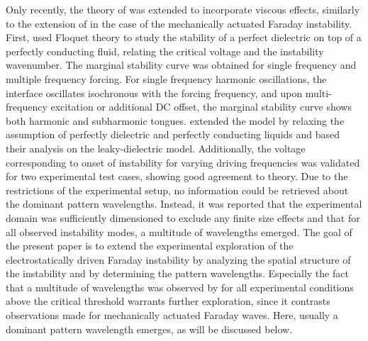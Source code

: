 \documentclass{jfm_arxiv}
\begin{document}
Only recently, the theory of \citet{Yih1968} was extended to incorporate viscous effects, similarly to the extension of \citet{Kumar1994} in the case of the mechanically actuated Faraday instability. First, \citet{Bandopadhyay2017} used Floquet theory to study the stability of a perfect dielectric on top of a perfectly conducting fluid, relating the critical voltage and the instability wavenumber.
The marginal stability curve was obtained for single frequency and multiple frequency forcing. For single frequency harmonic oscillations, the interface oscillates isochronous with the forcing frequency, and upon multi-frequency excitation or additional DC offset, the marginal stability curve shows both harmonic and subharmonic tongues.
\citet{Ward2019} extended the model by relaxing the assumption of perfectly dielectric and perfectly conducting liquids and based their analysis on the leaky-dielectric model. 
Additionally, the voltage corresponding to onset of instability for varying driving frequencies was validated for two experimental test cases, showing good agreement to theory.
Due to the restrictions of the experimental setup, no information could be retrieved about the dominant pattern wavelengths. Instead, it was reported that the experimental domain was sufficiently dimensioned to exclude any finite size effects and that for all observed instability modes, a multitude of wavelengths emerged. The goal of the present paper is to extend the experimental exploration of the electrostatically driven Faraday instability by analyzing the spatial structure of the instability and by determining the pattern wavelengths. Especially the fact that a multitude of wavelengths was observed by \citeauthor{Ward2019} for all experimental conditions above the critical threshold warrants further exploration, since it contrasts observations made for mechanically actuated Faraday waves. Here, usually a dominant pattern wavelength emerges, as will be discussed below. 
\end{document}
